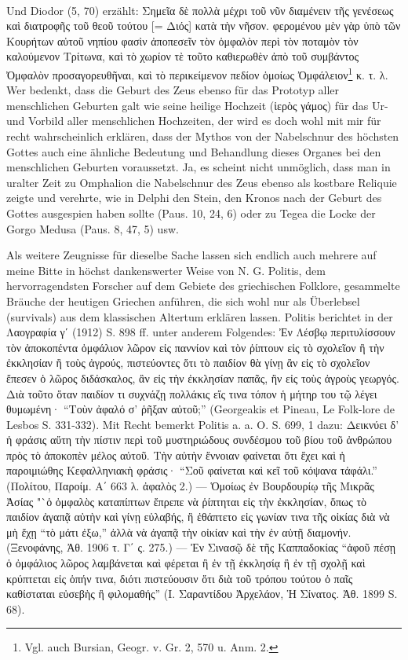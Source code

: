 \documentclass[a4paper, 11pt, oneside]{article}
\begin{document}
\paragraph{}
Und Diodor (5, 70) erzählt: Σημεῖα δὲ πολλὰ μέχρι τοῦ νῦν διαμένειν τῆς γενέσεως καὶ διατροφῆς τοῦ θεοῦ τούτου [= Διός] κατὰ τὴν νῆσον. φερομένου μὲν γὰρ ὑπὸ τῶν Κουρήτων αὐτοῦ νηπίου φασὶν ἀποπεσεῖν τὸν ὀμφαλὸν περὶ τὸν ποταμὸν τὸν καλούμενον Τρίτωνα, καὶ τὸ χωρίον τὲ τοῦτο καθιερωθὲν ἀπὸ τοῦ συμβάντος Ὀμφαλὸν προσαγορευθῆναι, καὶ τὸ περικείμενον πεδίον ὁμοίως Ὀμφάλειον\footnote{Vgl. auch Bursian, Geogr. v. Gr. 2, 570 u. Anm. 2.} κ. τ. λ. Wer bedenkt, dass die Geburt des Zeus ebenso für das Prototyp aller menschlichen Geburten galt wie seine heilige Hochzeit (ἱερὸς γάμος) für das Ur- und Vorbild aller menschlichen Hochzeiten, der wird es doch wohl mit mir für recht wahrscheinlich erklären, dass der Mythos von der Nabelschnur des höchsten Gottes auch eine ähnliche Bedeutung und Behandlung dieses Organes bei den menschlichen Geburten voraussetzt. Ja, es scheint nicht unmöglich, dass man in uralter Zeit zu Omphalion die Nabelschnur des Zeus ebenso als kostbare Reliquie zeigte und verehrte, wie in Delphi den Stein, den Kronos nach der Geburt des Gottes ausgespien haben sollte (Paus. 10, 24, 6) oder zu Tegea die Locke der Gorgo Medusa (Paus. 8, 47, 5) usw.

Als weitere Zeugnisse für dieselbe Sache lassen sich endlich auch mehrere auf meine Bitte in höchst dankenswerter Weise von N. G. Politis, dem hervorragendsten Forscher auf dem Gebiete des griechischen Folklore, gesammelte Bräuche der heutigen Griechen anführen, die sich wohl nur als Überlebsel (survivals) aus dem klassischen Altertum erklären lassen. Politis berichtet in der Λαογραφία γʹ (1912) S. 898 ff. unter anderem Folgendes: Ἐν Λέσβῳ περιτυλίσσουν τὸν ἀποκοπέντα ὀμφάλιον λῶρον εἰς παννίον καὶ τὸν ῥίπτουν εἰς τὸ σχολεῖον ἢ τὴν ἐκκλησίαν ἢ τοὺς ἀγρούς, πιστεύοντες ὅτι τὸ παιδίον θὰ γίνῃ ἂν εἰς τὸ σχολεῖον ἔπεσεν ὁ λῶρος διδάσκαλος, ἂν εἰς τὴν ἐκκλησίαν παπᾶς, ἢν εἰς τοὺς ἀγροὺς γεωργός. Διὰ τοῦτο ὅταν παιδίον τι συχνάζῃ πολλάκις εἴς τινα τόπον ἡ μήτηρ του τῷ λέγει θυμωμένη· "`Τοὺν ἀφαλό σ' ῥῆξαν αὐτοῦ;"' (Georgeakis et Pineau, Le Folk-lore de Lesbos S. 331-332). Mit Recht bemerkt Politis a. a. O. S. 699, 1 dazu: Δεικνύει δ' ἡ φράσις αὕτη τὴν πίστιν περὶ τοῦ μυστηριώδους συνδέσμου τοῦ βίου τοῦ ἀνθρώπου πρὸς τὸ ἀποκοπὲν μέλος αὐτοῦ. Τὴν αὐτὴν ἔννοιαν φαίνεται ὅτι ἔχει καὶ ἡ παροιμιώθης Κεφαλληνιακὴ φράσις· "`Σοῦ φαίνεται καὶ κεῖ τοῦ κόψανα τἀφάλι."' (Πολίτου, Παροίμ. Α΄ 663 λ. ἀφαλὸς 2.) --- Ὁμοίως ἐν Βουρδουρίῳ τῆς Μικρᾶς Ἀσίας "`ὁ ὀμφαλὸς καταπίπτων ἔπρεπε νὰ ῥίπτηται εἰς τὴν ἐκκλησίαν, ὅπως τὸ παιδίον ἀγαπᾷ αὐτὴν καὶ γίνῃ εὐλαβής, ἣ ἐθάπτετο εἰς γωνίαν τινα τῆς οἰκίας διὰ νὰ μὴ ἔχῃ "`τὸ μάτι ἐξω,"' ἀλλὰ νὰ ἀγαπᾷ τὴν οἰκίαν καὶ τὴν ἐν αὐτῇ διαμονήν. (Ξενοφάνης, Ἀθ. 1906 τ. Γ΄ ς. 275.) --- Ἐν Σινασῷ δὲ τῆς Καππαδοκίας "`ἀφοῦ πέσῃ ὁ ὀμφάλιος λῶρος λαμβάνεται καὶ φέρεται ἢ ἐν τῇ ἐκκλησίᾳ ἢ ἐν τῇ σχολῇ καὶ κρύπτεται εἰς ὁπήν τινα, διότι πιστεύουσιν ὅτι διὰ τοῦ τρόπου τούτου ὁ παῖς καθίσταται εὐσεβὴς ἢ φιλομαθής"' (Ι. Σαραντίδου Ἀρχελάον, Ἡ Σίνατος. Ἀθ. 1899 S. 68).
\end{document}
